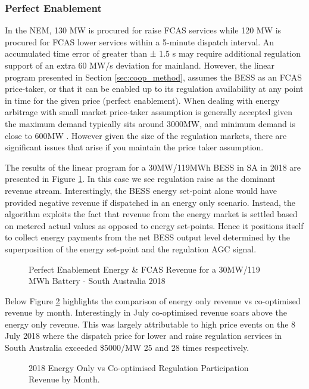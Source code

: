\subsubsection{Perfect Enablement}
In the NEM, 130 MW is procured for raise FCAS services while 120 MW is procured for FCAS lower services within a 5-minute dispatch interval. An accumulated time error of greater than ± 1.5 s may require additional regulation support of an extra 60 MW/s deviation for mainland. However, the linear program presented  in  Section  \ref{sec:coop_method},  assumes  the  BESS  as  an  FCAS  price-taker,  or  that  it  can  be  enabled  up  to its regulation availability at any point in time for the given price (perfect enablement). When dealing with energy arbitrage with small market price-taker assumption is generally accepted given the maximum demand typically sits around 3000MW, and minimum demand is close to 600MW \parencite{sa_aemo}. However given the size of the regulation markets, there are significant issues that arise if you maintain the price taker assumption. 

The results of the linear program for a 30MW/119MWh BESS in SA in 2018 are presented in Figure \ref{fig:perfectenablement}.  In this case we see regulation raise as the dominant revenue stream.  Interestingly,  the BESS energy set-point alone would have provided negative revenue if dispatched in an energy only scenario.  Instead, the algorithm exploits the fact that revenue from the energy market is settled based on metered actual values as opposed to energy set-points.  Hence it positions itself to collect energy payments from the net BESS output level determined by the superposition of the energy set-point and the regulation AGC signal.

\begin{figure}[H]
    \centering
    \caption{Perfect  Enablement  Energy  \&  FCAS  Revenue  for  a  30MW/119 MWh  Battery  -  South Australia 2018}
    \label{fig:perfectenablement}
\end{figure}
Below Figure \ref{fig:energyonly_vs_perfectenablement} highlights the comparison of energy only revenue vs co-optimised revenue by month. Interestingly in July co-optimised revenue soars above the energy only revenue. This was largely attributable to high price events on the 8 July 2018 where the dispatch price for lower and raise regulation services in
South Australia exceeded \$5000/MW 25 and 28 times respectively.
\begin{figure}[H]
    \centering
    \caption{2018 Energy Only vs Co-optimised Regulation Participation Revenue by Month.}
    \label{fig:energyonly_vs_perfectenablement}
\end{figure}
